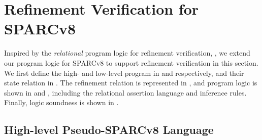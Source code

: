 \section{Refinement Verification for SPARCv8}
\label{sec:refine-verification-sparc}

Inspired by the {\it relational} program logic for 
refinement verification, , 
we extend our program logic for SPARCv8 to support
refinement verification in this section. 
We first define the high- and low-level program in 
\Sec{\ref{subsec:High-level Pseudo-SPARCv8 Language}} and 
\Sec{\ref{subsec:low-level SPARCv8 Program}} respectively, 
and their state relation in \Sec{\ref{subsec:state-rel}}. 
The refinement relation is represented in 
\Sec{\ref{subsec:correctness-primitive}}, 
and program logic is shown in 
\Sec{\ref{subsec:rel-assertion}} and 
\Sec{\ref{subsec:logic-rule-refinemet}}, 
including the relational assertion language 
and inference rules.  
Finally, logic soundness is shown in 
\Sec{\ref{subsec:logic-ensuring-ctxrefinement}}.

\subsection{High-level Pseudo-SPARCv8 Language}
\label{subsec:High-level Pseudo-SPARCv8 Language}

